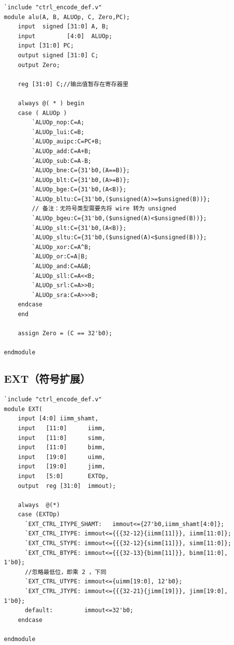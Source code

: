 \documentclass[UTF8,a4paper,autofakebold,15pt]{ctexart}
\begin{document}
{\lstset{language=verilog}
	\begin{lstlisting}
`include "ctrl_encode_def.v"
module alu(A, B, ALUOp, C, Zero,PC);
	input  signed [31:0] A, B;
	input         [4:0]  ALUOp;
	input [31:0] PC;
	output signed [31:0] C;
	output Zero;

	reg [31:0] C;//输出值暂存在寄存器里

	always @( * ) begin
	case ( ALUOp )
		`ALUOp_nop:C=A;
		`ALUOp_lui:C=B;
		`ALUOp_auipc:C=PC+B;
		`ALUOp_add:C=A+B;
		`ALUOp_sub:C=A-B;
		`ALUOp_bne:C={31'b0,(A==B)};
		`ALUOp_blt:C={31'b0,(A>=B)};
		`ALUOp_bge:C={31'b0,(A<B)};
		`ALUOp_bltu:C={31'b0,($unsigned(A)>=$unsigned(B))};
		// 备注：无符号类型需要先将 wire 转为 unsigned
		`ALUOp_bgeu:C={31'b0,($unsigned(A)<$unsigned(B))};
		`ALUOp_slt:C={31'b0,(A<B)};
		`ALUOp_sltu:C={31'b0,($unsigned(A)<$unsigned(B))};
		`ALUOp_xor:C=A^B;
		`ALUOp_or:C=A|B;
		`ALUOp_and:C=A&B;
		`ALUOp_sll:C=A<<B;
		`ALUOp_srl:C=A>>B;
		`ALUOp_sra:C=A>>>B;
	endcase
	end

	assign Zero = (C == 32'b0);

endmodule

\end{lstlisting}}
	

\subsection{EXT（符号扩展）}

{\lstset{language=verilog}
	\begin{lstlisting}
`include "ctrl_encode_def.v"
module EXT( 
	input [4:0] iimm_shamt,
	input	[11:0]		iimm,
	input	[11:0]		simm,
	input	[11:0]		bimm,
	input	[19:0]		uimm,
	input	[19:0]		jimm,
	input	[5:0]		EXTOp,
	output	reg [31:0]  immout);

	always  @(*)
	case (EXTOp)
	  `EXT_CTRL_ITYPE_SHAMT:   immout<={27'b0,iimm_shamt[4:0]};
	  `EXT_CTRL_ITYPE: immout<={{{32-12}{iimm[11]}}, iimm[11:0]};
	  `EXT_CTRL_STYPE: immout<={{{32-12}{simm[11]}}, simm[11:0]};
	  `EXT_CTRL_BTYPE: immout<={{{32-13}{bimm[11]}}, bimm[11:0], 1'b0}; 
	  //忽略最低位，即乘 2 ，下同
	  `EXT_CTRL_UTYPE: immout<={uimm[19:0], 12'b0}; 
	  `EXT_CTRL_JTYPE: immout<={{{32-21}{jimm[19]}}, jimm[19:0], 1'b0};
  	  default:	       immout<=32'b0;
	endcase

endmodule
		
\end{lstlisting}}
\end{document}
